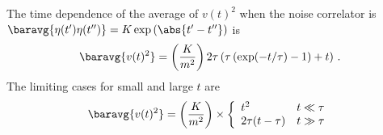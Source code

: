 
The time dependence of the average of $v(t)^2$ when the noise correlator is $\baravg{\eta(t')\eta(t'')} = K \exp \left( \abs{t' - t''}\right)$ is
\begin{equation*}
  \baravg{v(t)^2} =
    \left( \frac{K}{m^2} \right)2 \tau \left(\tau \left( \exp(-t/\tau) - 1 \right) + t \right)
    \, .
\end{equation*}
The limiting cases for small and large $t$ are
\begin{equation*}
	\baravg{v(t)^2} = \left( \frac{K}{m^2} \right) \times \left\{ \begin{array}{lr}
   t^2 & t \ll \tau \\
  2 \tau (t - \tau) & t \gg \tau
  \end{array} \right.
\end{equation*}
